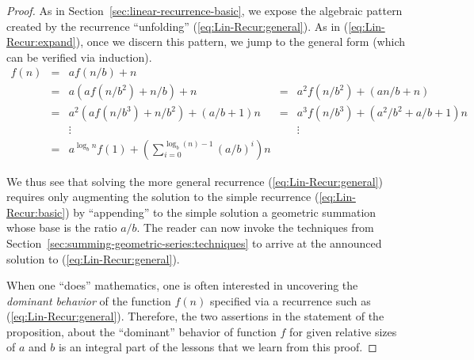 \begin{proof}
As in Section~\ref{sec:linear-recurrence-basic}, we expose the
algebraic pattern created by the recurrence ``unfolding''
(\ref{eq:Lin-Recur:general}).  As in (\ref{eq:Lin-Recur:expand}), once
we discern this pattern, we jump to the general form (which can be
verified via induction).
\[
\begin{array}{ccccc}
f(n) & = & a f(n/b) + n & & \\
     & = & a \left( a f(n/b^2) + n/b \right) + n
             & = & a^2 f(n/b^2) + (an/b+n) \\
     & = & a^2 \left( a f(n/b^3) + n/b^2 \right) + (a/b+1)n
             & = & a^3 f(n/b^3) + (a^2/b^2+a/b+1)n \\
     &   & \vdots & & \vdots \\
    & = & 
{\displaystyle
a^{\log_b n} f(1) + \left( \sum_{i=0}^{\log_b (n)-1} (a/b)^i \right) n
} & &
\end{array}
\]

We thus see that solving the more general recurrence
(\ref{eq:Lin-Recur:general}) requires only augmenting the solution to
the simple recurrence (\ref{eq:Lin-Recur:basic}) by ``appending'' to
the simple solution a geometric summation whose base is the ratio
$a/b$.  The reader can now invoke the techniques from
Section~\ref{sec:summing-geometric-series:techniques} to arrive at the
announced solution to (\ref{eq:Lin-Recur:general}).

When one ``does'' mathematics, one is often interested in uncovering
the {\em dominant behavior} of the function $f(n)$ specified via a
recurrence such as (\ref{eq:Lin-Recur:general}).  Therefore, the two
assertions in the statement of the proposition, about the ``dominant''
behavior of function $f$ for given relative sizes of $a$ and $b$ is an
integral part of the lessons that we learn from this proof.

\end{proof}
